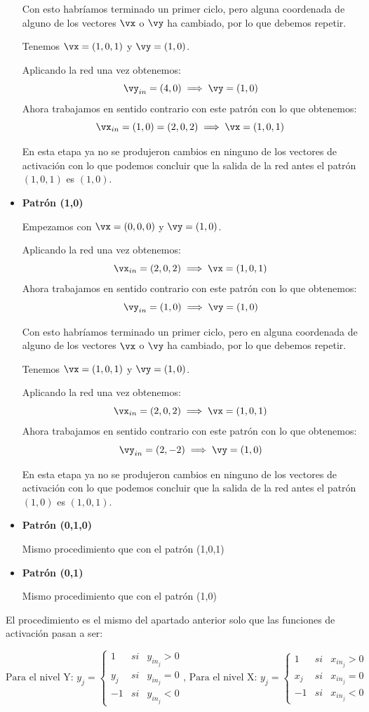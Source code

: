 \begin{problem}[10]
\begin{itemize}
Con esto habríamos terminado un primer ciclo, pero alguna coordenada de alguno de los vectores $\vx$ o $\vy$ ha cambiado, por lo que debemos repetir.

Tenemos $\vx=(1,0,1)$ y $\vy = (1,0)$.

Aplicando la red una vez obtenemos:
\[\vy_{in} = (4,0) \implies \vy = (1,0)\]
Ahora trabajamos en sentido contrario con este patrón con lo que obtenemos:
\[\vx_{in} = (1,0) = (2,0,2) \implies \vx = (1,0,1)\]

En esta etapa ya no se produjeron cambios en ninguno de los vectores de activación con lo que podemos concluir que la salida de la red antes el patrón $(1,0,1)$ es $(1,0)$.

\item \textbf{Patrón (1,0)}

Empezamos con $\vx=(0,0,0)$ y $\vy = (1,0)$.

Aplicando la red una vez obtenemos:
\[\vx_{in} = (2,0,2) \implies \vx = (1,0,1)\]
Ahora trabajamos en sentido contrario con este patrón con lo que obtenemos:
\[\vy_{in} = (1,0)  \implies \vy = (1,0)\]

Con esto habríamos terminado un primer ciclo, pero en alguna coordenada de alguno de los vectores $\vx$ o $\vy$ ha cambiado, por lo que debemos repetir.

Tenemos $\vx=(1,0,1)$ y $\vy = (1,0)$.

Aplicando la red una vez obtenemos:
\[\vx_{in} = (2,0,2) \implies \vx = (1,0,1)\]
Ahora trabajamos en sentido contrario con este patrón con lo que obtenemos:
\[\vy_{in} = (2,-2) \implies \vy = (1,0)\]


En esta etapa ya no se produjeron cambios en ninguno de los vectores de activación con lo que podemos concluir que la salida de la red antes el patrón $(1,0)$ es $(1,0,1)$.

\item \textbf{Patrón (0,1,0)}

Mismo procedimiento que con el patrón (1,0,1)

\item \textbf{Patrón (0,1)}

Mismo procedimiento que con el patrón (1,0)
\end{itemize}

\spart

El procedimiento es el mismo del apartado anterior solo que las funciones de activación pasan a ser:

\[\text{Para el nivel Y: } y_j = \left\{ \begin{array}{lll}
1   & si & y_{in_j} > 0 \\
y_j & si & y_{in_j} = 0 \\
-1   & si & y_{in_j} < 0
\end{array}\right. \text{,   Para el nivel X: } y_j = \left\{ \begin{array}{lll}
1   & si & x_{in_j} > 0 \\
x_j & si & x_{in_j} = 0 \\
-1   & si & x_{in_j} < 0
\end{array}\right.\]


\end{problem}
